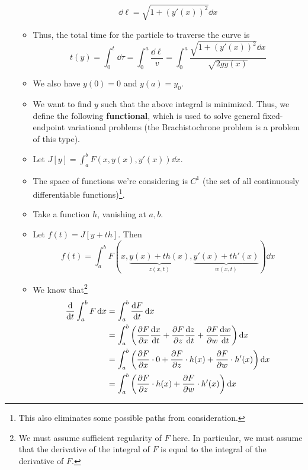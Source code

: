 \documentclass[../notes.tex]{subfiles}
\begin{document}
\begin{itemize}
\begin{itemize}
\begin{equation*}
            \dd\ell = \sqrt{1+(y'(x))^2}\dd{x}
        \end{equation*}
        \item Thus, the total time for the particle to traverse the curve is
        \begin{equation*}
            t(y) = \int_0^t\dd{\tau}
            = \int_0^a\frac{\dd\ell}{v}
            = \int_0^a\frac{\sqrt{1+(y'(x))^2}\dd{x}}{\sqrt{2gy(x)}}
        \end{equation*}
        \item We also have $y(0)=0$ and $y(a)=y_0$.
        \item We want to find $y$ such that the above integral is minimized. Thus, we define the following \textbf{functional}, which is used to solve general fixed-endpoint variational problems (the Brachistochrone problem is a problem of this type).
        \item Let $J[y]=\int_a^bF(x,y(x),y'(x))\dd{x}$.
        \item The space of functions we're considering is $C^1$ (the set of all continuously differentiable functions)\footnote{This also eliminates some possible paths from consideration.}.
        \item Take a function $h$, vanishing at $a,b$.
        \item Let $f(t)=J[y+th]$. Then
        \begin{equation*}
            f(t) = \int_a^bF(x,\underbrace{y(x)+th(x)}_{z(x,t)},\underbrace{y'(x)+th'(x)}_{w(x,t)})\dd{x}
        \end{equation*}
        \item We know that\footnote{We must assume sufficient regularity of $F$ here. In particular, we must assume that the derivative of the integral of $F$ is equal to the integral of the derivative of $F$.}
        \begin{align*}
            \dv{t}\int_a^bF\dd{x} &= \int_a^b\dv{F}{t}\dd{x}\\
            &= \int_a^b\left( \pdv{F}{x}\dv{x}{t}+\pdv{F}{z}\dv{z}{t}+\pdv{F}{w}\dv{w}{t} \right)\dd{x}\\
            &= \int_a^b\left( \pdv{F}{x}\cdot 0+\pdv{F}{z}\cdot h(x)+\pdv{F}{w}\cdot h'(x) \right)\dd{x}\\
            &= \int_a^b\left( \pdv{F}{z}\cdot h(x)+\pdv{F}{w}\cdot h'(x) \right)\dd{x}

\end{align*}
\end{itemize}
\end{itemize}
\end{document}
